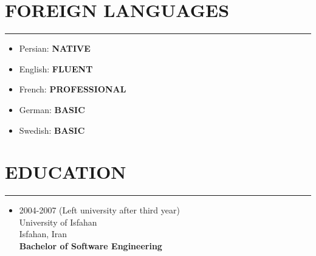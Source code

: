 \documentclass[10pt,a4paper]{article}
\begin{document}

\section{FOREIGN LANGUAGES}
\noindent \rule {3.0cm}{0.4pt}
  \begin{itemize}
    \item Persian: \textbf{NATIVE}
    \item English: \textbf{FLUENT}
    \item French: \textbf{PROFESSIONAL}
    \item German: \textbf{BASIC}
    \item Swedish: \textbf{BASIC}
  \end{itemize}
  
\section{EDUCATION}
\noindent \rule {3.0cm}{0.4pt}
  \begin{itemize}
    \item \small {2004-2007 (Left university after third year)\\
                  University of Isfahan \\
                  Isfahan, Iran \\
                  \textbf{Bachelor of Software Engineering}}
  \end{itemize}


\end{document}
